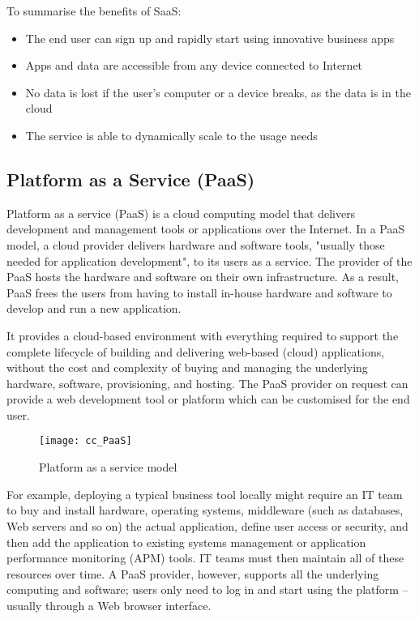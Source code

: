 To summarise the benefits of SaaS:
\begin{itemize}
	\item The end user can sign up and rapidly start using innovative business apps
	\item Apps and data are accessible from any device connected to Internet
	\item No data is lost if the user's computer or a device breaks, as the data is in the cloud
	\item The service is able to dynamically scale to the usage needs
\end{itemize}

\subsection{Platform as a Service (PaaS)}\label{ssec:PaaS}
Platform as a service (PaaS) is a cloud computing model that delivers development and management tools or applications over the Internet. In a PaaS model, a cloud provider delivers hardware and software tools, "usually those needed for application development", to its users as a service. The provider of the PaaS hosts the hardware and software on their own infrastructure. As a result, PaaS frees the users from having to install in-house hardware and software to develop and run a new application.

It provides a cloud-based environment with everything required to support the complete lifecycle of building and delivering web-based (cloud) applications, without the cost and complexity of buying and managing the underlying hardware, software, provisioning, and hosting. The PaaS provider on request can provide a web development tool or platform which can be customised for the end user.


\begin{figure}[H]
	\begin{center}
		\texttt{[image: cc\_PaaS]}
		\caption{Platform as a service model\cite{IBMcloud:PaaS}}
		\label{fig:cc_PaaS}
	\end{center}
	\vspace{-10pt}
\end{figure}

For example, deploying a typical business tool locally might require an IT team to buy and install hardware, operating systems, middleware (such as databases, Web servers and so on) the actual application, define user access or security, and then add the application to existing systems management or application performance monitoring (APM) tools. IT teams must then maintain all of these resources over time. A PaaS provider, however, supports all the underlying computing and software; users only need to log in and start using the platform – usually through a Web browser interface.

